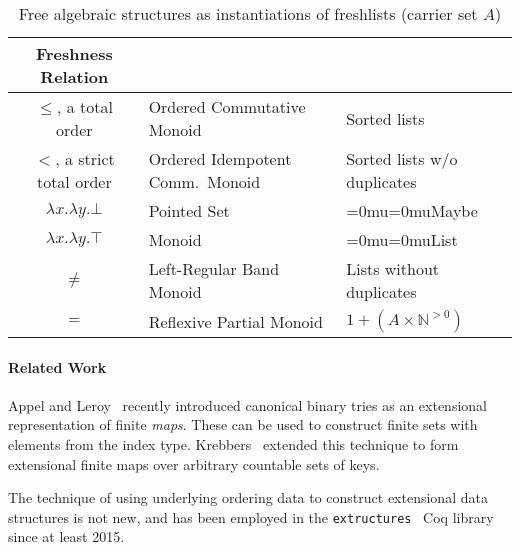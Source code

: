 \documentclass[a4paper]{easychair}
\newcommand{\AgdaFontStyle}[1]{\textsf{#1}}
\newcommand{\AgdaFormat}[2]{#2}
\newcommand{\AgdaNoSpaceMath}[1]
    {\begingroup\thickmuskip=0mu\medmuskip=0mu#1\endgroup}
\newcommand{\AgdaDatatype}[1]
    {\AgdaNoSpaceMath{\textcolor{AgdaDatatype}{\AgdaFontStyle{\AgdaFormat{#1}{{#1}}}}}}
\begin{document}
\begin{table}[bh]\centering
  \begin{tabular}{  |c|m{16em}|m{12em}| }
    \hline
    Freshness Relation & \centering{Free Algebraic Structure} & \centering{Data Structure} \tabularnewline
                                                                \hline
                                                                $\leq$, a total order & Ordered Commutative Monoid & Sorted lists \\
    $<$, a strict total order & Ordered Idempotent Comm.\ Monoid & Sorted lists w/o duplicates \\
    $\lambda x. \lambda y. \bot$ & Pointed Set & \AgdaDatatype{Maybe} \\
    $\lambda x. \lambda y. \top$ & Monoid & \AgdaDatatype{List} \\
    $\neq$ & Left-Regular Band Monoid & Lists without duplicates \\
    $=$ & Reflexive Partial Monoid & $1 + (A \times \mathbb{N}^{>0})$ \\
    \hline
  \end{tabular}
  \caption{Free algebraic structures as instantiations of freshlists (carrier set $A$)}
  \label{tab:other-results}
\end{table}

\paragraph{Related Work}
Appel and Leroy~\cite{appelleroy2023tries} recently introduced canonical binary tries as an extensional representation of finite \emph{maps}.
These can be used to construct finite sets with elements from the index type.
Krebbers~\cite{krebbers2023extensionalmaps} extended this technique to form extensional finite maps over arbitrary countable sets of keys.

The technique of using underlying ordering data to construct extensional data structures is not new, and has been employed in the \texttt{extructures}~\cite{extructures} Coq library since at least 2015.






%
%
%


\end{document}
